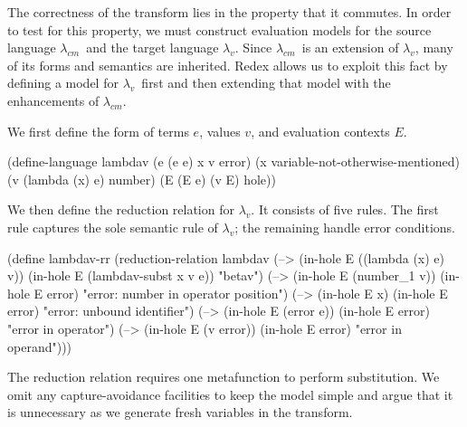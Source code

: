 \documentclass{llncs}
\newcommand{\cm}[0]{$\lambda_{cm}$}
\newcommand{\lv}[0]{$\lambda_v$}
\begin{document}
The correctness of the transform lies in the property that it commutes. In order to test for this property, we must construct evaluation models for the source language \cm\ and the target language \lv. Since \cm\ is an extension of \lv, many of its forms and semantics are inherited. Redex allows us to exploit this fact by defining a model for \lv\ first and then extending that model with the enhancements of \cm.


\setspecialsymbol{->}{$\to$}
\setspecialsymbol{-->}{$\rightarrow$}


We first define the form of terms $e$, values $v$, and evaluation contexts $E$.

\begin{schemedisplay}
(define-language lambdav
  (e (e e) x v error)
  (x variable-not-otherwise-mentioned)
  (v (lambda (x) e) number)
  (E (E e) (v E) hole))
\end{schemedisplay}

We then define the reduction relation for \lv. It consists of five rules. The first rule captures the sole semantic rule of \lv; the remaining handle error conditions.

\begin{schemedisplay}
(define lambdav-rr
  (reduction-relation lambdav
   (--> (in-hole E ((lambda (x) e) v))
        (in-hole E (lambdav-subst x v e))
        "betav")
   (--> (in-hole E (number_1 v))
        (in-hole E error)
        "error: number in operator position")
   (--> (in-hole E x)
        (in-hole E error)
        "error: unbound identifier")
   (--> (in-hole E (error e))
        (in-hole E error)
        "error in operator")
   (--> (in-hole E (v error))
        (in-hole E error)
        "error in operand")))
\end{schemedisplay}

The reduction relation requires one metafunction to perform substitution. We omit any capture-avoidance facilities to keep the model simple and argue that it is unnecessary as we generate fresh variables in the transform.
\end{document}
